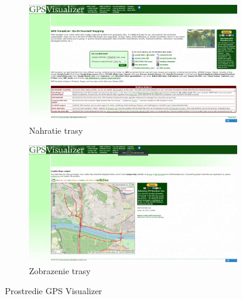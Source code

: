 \begin{figure}[H]
  \centering
  \begin{subfigure}{.9\textwidth}
    \centering
    \includegraphics[width=1\textwidth]{img/gps_visualizer/gpsvisualizer1.png}
    \caption{Nahratie trasy}
  \end{subfigure}
  \begin{subfigure}{.9\textwidth}
    \centering
    \includegraphics[width=1\textwidth]{img/gps_visualizer/gpsvisualizer2.png}
    \caption{Zobrazenie trasy}
  \end{subfigure}
  \caption{Prostredie GPS Visualizer}
  \label{fig:gps-visualizer}
\end{figure}

